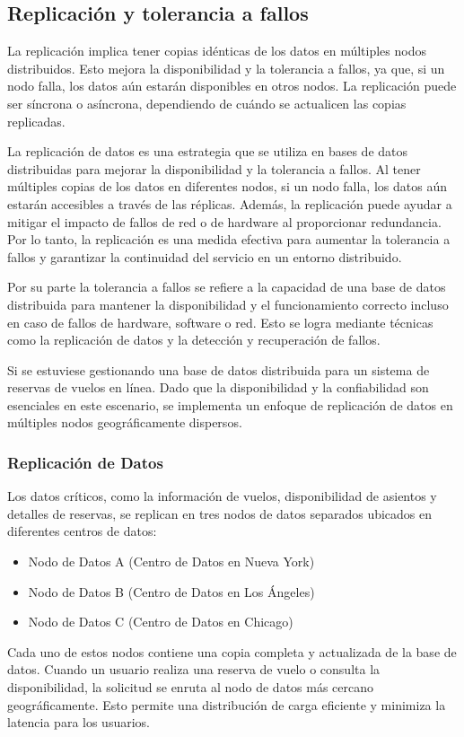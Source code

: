 \subsection{Replicación y tolerancia a fallos}
\noindent
La replicación implica tener copias idénticas de los datos en múltiples nodos distribuidos. Esto mejora la disponibilidad y la tolerancia a fallos, ya que, si un nodo falla, los datos aún estarán disponibles en otros nodos. La replicación puede ser síncrona o asíncrona, dependiendo de cuándo se actualicen las copias replicadas.

La replicación de datos es una estrategia que se utiliza en bases de datos distribuidas para mejorar la disponibilidad y la tolerancia a fallos. Al tener múltiples copias de los datos en diferentes nodos, si un nodo falla, los datos aún estarán accesibles a través de las réplicas. Además, la replicación puede ayudar a mitigar el impacto de fallos de red o de hardware al proporcionar redundancia. Por lo tanto, la replicación es una medida efectiva para aumentar la tolerancia a fallos y garantizar la continuidad del servicio en un entorno distribuido.

Por su parte la tolerancia a fallos se refiere a la capacidad de una base de datos distribuida para mantener la disponibilidad y el funcionamiento correcto incluso en caso de fallos de hardware, software o red. Esto se logra mediante técnicas como la replicación de datos y la detección y recuperación de fallos.

Si se estuviese gestionando una base de datos distribuida para un sistema de reservas de vuelos en línea. Dado que la disponibilidad y la confiabilidad son esenciales en este escenario, se implementa un enfoque de replicación de datos en múltiples nodos geográficamente dispersos.

\subsubsection{Replicación de Datos}
\noindent
Los datos críticos, como la información de vuelos, disponibilidad de asientos y detalles de reservas, se replican en tres nodos de datos separados ubicados en diferentes centros de datos:

\begin{itemize}
	\item Nodo de Datos A (Centro de Datos en Nueva York)
	\item Nodo de Datos B (Centro de Datos en Los Ángeles)
	\item Nodo de Datos C (Centro de Datos en Chicago)
\end{itemize}
Cada uno de estos nodos contiene una copia completa y actualizada de la base de datos. Cuando un usuario realiza una reserva de vuelo o consulta la disponibilidad, la solicitud se enruta al nodo de datos más cercano geográficamente. Esto permite una distribución de carga eficiente y minimiza la latencia para los usuarios.

